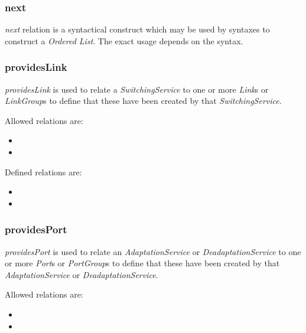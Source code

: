 \subsubsection{next}%
\label{rel:next}

\emph{next} relation is a syntactical construct which may be used by syntaxes to construct a \emph{Ordered List}. The exact usage depends on the syntax.


\subsubsection{providesLink}%
\label{rel:providesLink}

\emph{providesLink} is used to relate a \emph{SwitchingService} to one or more \emph{Link}s or \emph{LinkGroup}s to define that these have been created by that \emph{SwitchingService}.

Allowed relations are:
\begin{itemize}
    \item {}
    \item {}
\end{itemize}

Defined relations are:
\begin{itemize}
    \item {}
    \item {}
\end{itemize}


\subsubsection{providesPort}%
\label{rel:providesPort}

\emph{providesPort} is used to relate an \emph{AdaptationService} or \emph{DeadaptationService} to one or more \emph{Port}s or \emph{PortGroup}s to define that these have been created by that \emph{AdaptationService} or \emph{DeadaptationService}.

Allowed relations are:
\begin{itemize}
    \item {}
    \item {}
\end{itemize}

